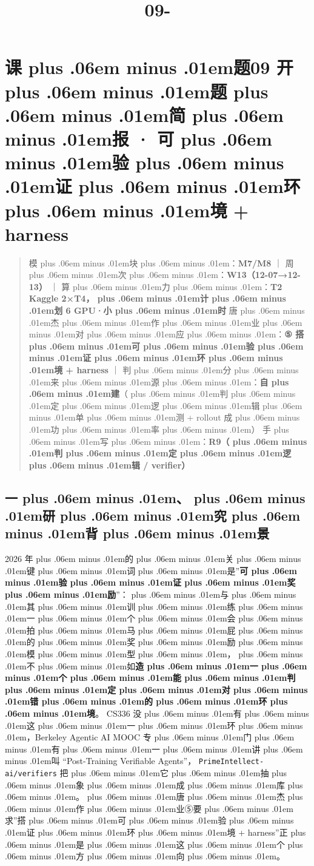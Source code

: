 \documentclass[
]{article}
\title{\zh{课\zhglue 题}09-\zh{可\zhglue 验\zhglue 证\zhglue 环\zhglue 境}}
\author{}
\date{}
\newcommand{\passthrough}[1]{#1}
\def\zh#1{{\zhfont #1}}
\def\sym#1{{\symfont #1}}
\def\zhglue{\hskip0pt plus .06em minus .01em}
\begin{document}
\maketitle

{
\setcounter{tocdepth}{2}
\tableofcontents
}
\section{\zh{课\zhglue 题}09 \zh{开\zhglue 题\zhglue 简\zhglue 报} \sym{·} \zh{可\zhglue 验\zhglue 证\zhglue 环\zhglue 境} + harness}\label{ux8bfeux989809-ux5f00ux9898ux7b80ux62a5-ux53efux9a8cux8bc1ux73afux5883-harness}

\begin{quote}
\zh{模\zhglue 块\zhglue ：}\textbf{M7/M8} \zh{｜} \zh{周\zhglue 次\zhglue ：}\textbf{W13\zh{（}12-07\sym{→}12-13\zh{）}} \zh{｜} \zh{算\zhglue 力\zhglue ：}\textbf{T2 Kaggle 2\sym{×}T4\zh{，\zhglue 计\zhglue 划} 6 GPU\sym{·}\zh{小\zhglue 时}} \zh{唐\zhglue 杰\zhglue 作\zhglue 业\zhglue 对\zhglue 应\zhglue ：}\textbf{\sym{⑤} \zh{搭\zhglue 可\zhglue 验\zhglue 证\zhglue 环\zhglue 境} + harness} \zh{｜} \zh{判\zhglue 分\zhglue 来\zhglue 源\zhglue ：}\textbf{\zh{自\zhglue 建}}\zh{（\zhglue 判\zhglue 定\zhglue 逻\zhglue 辑\zhglue 单\zhglue 测} + rollout \zh{成\zhglue 功\zhglue 率\zhglue ）} \zh{手\zhglue 写\zhglue ：}\textbf{R9\zh{（\zhglue 判\zhglue 定\zhglue 逻\zhglue 辑} / verifier\zh{）}}
\end{quote}

\subsection{\zh{一\zhglue 、\zhglue 研\zhglue 究\zhglue 背\zhglue 景}}\label{ux4e00ux7814ux7a76ux80ccux666f}

2026 \zh{年\zhglue 的\zhglue 关\zhglue 键\zhglue 词\zhglue 是}''\textbf{\zh{可\zhglue 验\zhglue 证\zhglue 奖\zhglue 励}}''\zh{：\zhglue 与\zhglue 其\zhglue 训\zhglue 练\zhglue 一\zhglue 个\zhglue 会\zhglue 拍\zhglue 马\zhglue 屁\zhglue 的\zhglue 奖\zhglue 励\zhglue 模\zhglue 型\zhglue ，\zhglue 不\zhglue 如}\textbf{\zh{造\zhglue 一\zhglue 个\zhglue 能\zhglue 判\zhglue 定\zhglue 对\zhglue 错\zhglue 的\zhglue 环\zhglue 境}}\zh{。} CS336 \zh{没\zhglue 有\zhglue 这\zhglue 一\zhglue 环\zhglue ，}Berkeley Agentic AI MOOC \zh{专\zhglue 门\zhglue 有\zhglue 一\zhglue 讲\zhglue 叫} ``Post-Training Verifiable Agents''\zh{，} \passthrough{\lstinline!PrimeIntellect-ai/verifiers!} \zh{把\zhglue 它\zhglue 抽\zhglue 象\zhglue 成\zhglue 库\zhglue 。\zhglue 唐\zhglue 杰\zhglue 作\zhglue 业}\sym{⑤}\zh{要\zhglue 求}''\zh{搭\zhglue 可\zhglue 验\zhglue 证\zhglue 环\zhglue 境} + harness''\zh{正\zhglue 是\zhglue 这\zhglue 个\zhglue 方\zhglue 向\zhglue 。}
\end{document}
